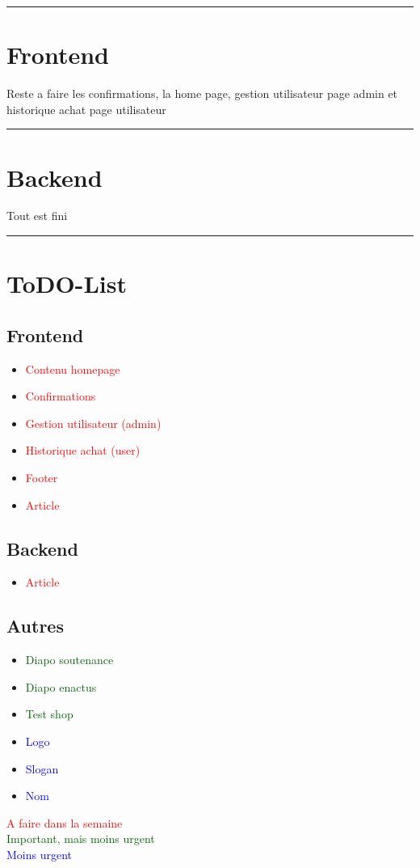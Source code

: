 \documentclass[10pt,a4paper]{report}
\begin{document}
\noindent\rule{\linewidth}{0.5mm} \bigskip
\section{Frontend}
Reste a faire les confirmations, la home page, gestion utilisateur page admin et historique achat page utilisateur

\noindent\rule{\linewidth}{0.5mm} \bigskip
\section{Backend}
Tout est fini

\noindent\rule{\linewidth}{0.5mm} \bigskip
\section{ToDO-List}
\subsection*{Frontend}
\begin{itemize}
        \item \textcolor{red}{Contenu homepage}
        \item \textcolor{red}{Confirmations}
        \item \textcolor{red}{Gestion utilisateur (admin)}
        \item \textcolor{red}{Historique achat (user)}
        \item \textcolor{red}{Footer}
        \item \textcolor{red}{Article}
\end{itemize}

\subsection*{Backend}
\begin{itemize}
        \item \textcolor{red}{Article}
\end{itemize}
\subsection*{Autres}
\begin{itemize}
        \item \textcolor{darkgreen}{Diapo soutenance}
        \item \textcolor{darkgreen}{Diapo enactus}
        \item \textcolor{darkgreen}{Test shop}
        \item \textcolor{blue}{Logo}
        \item \textcolor{blue}{Slogan}
        \item \textcolor{blue}{Nom}
\end{itemize}

\textcolor{red}{A faire dans la semaine} \\
\textcolor{darkgreen}{Important, mais moins urgent} \\
\textcolor{blue}{Moins urgent}
\end{document}
